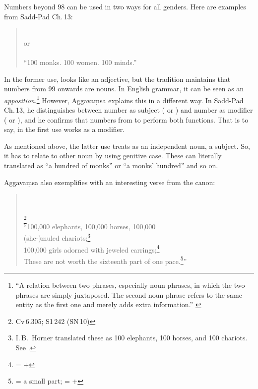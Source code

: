 Numbers beyond 98 can be used in two ways for all genders. Here are examples from Sadd-Pad Ch.\,13:

\begin{quote}
\\
or\\
\mbox{}\\[1.5mm]
``100 monks. 100 women. 100 minds.''
\end{quote}

In the former use,  looks like an adjective, but the tradition maintains that numbers from 99 onwards are nouns. In English grammar, it can be seen as an \emph{apposition}.\footnote{``A relation between two phrases, especially noun phrases, in which the two phrases are simply juxtaposed. The second noun phrase refers to the same entity as the first one and merely adds extra information.'' \citep[p.~32]{brownmiller:dict}} However, Aggava\d msa explains this in a different way. In Sadd-Pad Ch.\,13, he distinguishes between number as subject ( or ) and number as modifier ( or ), and he confirms that numbers from  to  perform both functions. That is to say, in the first use  works as a modifier.

As mentioned above, the latter use treats  as an independent noun, a subject. So, it has to relate to other noun by using genitive case. These can literally translated as ``a hundred of monks'' or ``a monks' hundred'' and so on.

Aggava\d msa also exemplifies with an interesting verse from the canon:

\begin{quote}
\\
\\
\footnote{Cv\,6.305; S1\,242 (SN\,10)}\\[1.5mm]
``100,000 elephants, 100,000 horses, 100,000 \\(she-)muled chariots;\footnote{I.\,B.\ Horner translated these as 100 elephants, 100 horses, and 100 chariots. See \citealp[p.~2197]{horner:discipline}.}\\
100,000 girls adorned with jeweled earrings;\footnote{ =  + }\\
These are not worth the sixteenth part of one pace.\footnote{ = a small part;  =  + }''
\end{quote}


